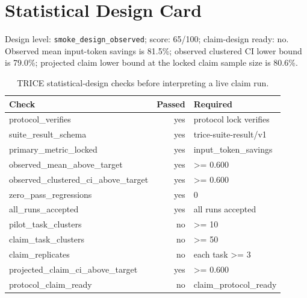 \section{Statistical Design Card}
Design level: \texttt{smoke\_design\_observed}; score: 65/100; claim-design ready: no. Observed mean input-token savings is 81.5\%; observed clustered CI lower bound is 79.0\%; projected claim lower bound at the locked claim sample size is 80.6\%.

\begin{table}[h]
\centering
\begin{tabular}{lrl}
\toprule
Check & Passed & Required \\
\midrule
protocol\_verifies & yes & protocol lock verifies \\
suite\_result\_schema & yes & trice-suite-result/v1 \\
primary\_metric\_locked & yes & input\_token\_savings \\
observed\_mean\_above\_target & yes & >= 0.600 \\
observed\_clustered\_ci\_above\_target & yes & >= 0.600 \\
zero\_pass\_regressions & yes & 0 \\
all\_runs\_accepted & yes & all runs accepted \\
pilot\_task\_clusters & no & >= 10 \\
claim\_task\_clusters & no & >= 50 \\
claim\_replicates & no & each task >= 3 \\
projected\_claim\_ci\_above\_target & yes & >= 0.600 \\
protocol\_claim\_ready & no & claim\_protocol\_ready \\
\bottomrule
\end{tabular}
\caption{TRICE statistical-design checks before interpreting a live claim run.}
\end{table}
